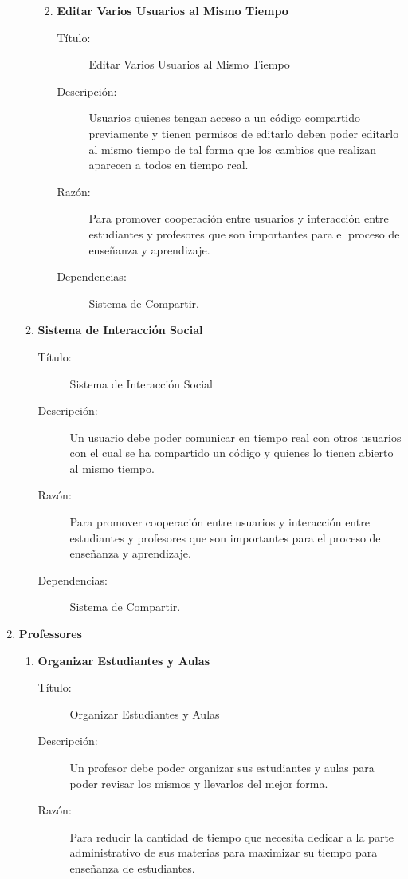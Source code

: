 \begin{enumerate}
\begin{enumerate}
\begin{enumerate}
\begin{description}
            \end{description}
			\item \textbf{Editar Varios Usuarios al Mismo Tiempo}
            \begin{description}
				\item[Título:] Editar Varios Usuarios al Mismo Tiempo
				\item[Descripción:] Usuarios quienes tengan acceso a un código compartido previamente y tienen permisos de editarlo deben poder editarlo al mismo tiempo de tal forma que los cambios que realizan aparecen a todos en tiempo real.
				\item[Razón:] Para promover cooperación entre usuarios y interacción entre estudiantes y profesores que son importantes para el proceso de enseñanza y aprendizaje.
				\item[Dependencias:] Sistema de Compartir.
            \end{description}
        \end{enumerate}
        \item \textbf{Sistema de Interacción Social}
        \begin{description}
			\item[Título:] Sistema de Interacción Social
			\item[Descripción:] Un usuario debe poder comunicar en tiempo real con otros usuarios con el cual se ha compartido un código y quienes lo tienen abierto al mismo tiempo.
			\item[Razón:] Para promover cooperación entre usuarios y interacción entre estudiantes y profesores que son importantes para el proceso de enseñanza y aprendizaje.
			\item[Dependencias:] Sistema de Compartir.
        \end{description}
	\end{enumerate}
    \item \textbf{Professores}
    \begin{enumerate}
		\item \textbf{Organizar Estudiantes y Aulas}
        \begin{description}
			\item[Título:] Organizar Estudiantes y Aulas
			\item[Descripción:] Un profesor debe poder organizar sus estudiantes y aulas para poder revisar los mismos y llevarlos del mejor forma.
			\item[Razón:] Para reducir la cantidad de tiempo que necesita dedicar a la parte administrativo de sus materias para maximizar su tiempo para enseñanza de estudiantes.

\end{description}
\end{enumerate}
\end{enumerate}
